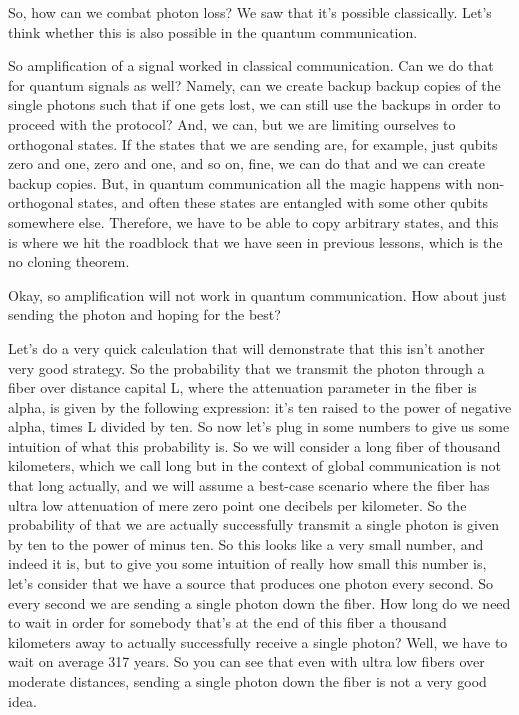 So, how can we combat photon loss? We saw that it's possible classically. Let's think whether this is also possible in the quantum communication.

So amplification of a signal worked in classical communication. Can we do that for quantum signals as well? Namely, can we create backup backup copies of the single photons such that if one gets lost, we can still use the backups in order to proceed with the protocol? And, we can, but we are limiting ourselves to orthogonal states. If the states that we are sending are, for example, just qubits zero and one, zero and one, and so on, fine, we can do that and we can create backup copies. But, in quantum communication all the magic happens with non-orthogonal states, and often these states are entangled with some other qubits somewhere else. Therefore, we have to be able to copy arbitrary states, and this is where we hit the roadblock that we have seen in previous lessons, which is the no cloning theorem.

Okay, so amplification will not work in quantum communication. How about just sending the photon and hoping for the best?

Let's do a very quick calculation that will demonstrate that this isn't another very good strategy. So the probability that we transmit the photon through a fiber over distance capital L, where the attenuation parameter in the fiber is alpha, is given by the following expression: it's ten raised to the power of negative alpha, times L divided by ten. So now let's plug in some numbers to give us some intuition of what this probability is. So we will consider a long fiber of thousand kilometers, which we call long but in the context of global communication is not that long actually, and we will assume a best-case scenario where the fiber has ultra low attenuation of mere zero point one decibels per kilometer. So the probability of that we are actually successfully transmit a single photon is given by ten to the power of minus ten. So this looks like a very small number, and indeed it is, but to give you some intuition of really how small this number is, let's consider that we have a source that produces one photon every second. So every second we are sending a single photon down the fiber. How long do we need to wait in order for somebody that's at the end of this fiber a thousand kilometers away to actually successfully receive a single photon? Well, we have to wait on average 317 years. So you can see that even with ultra low fibers over moderate distances, sending a single photon down the fiber is not a very good idea.

